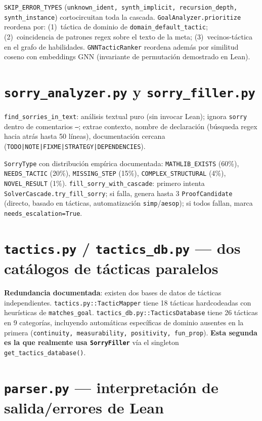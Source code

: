 \documentclass[11pt,a4paper]{report}
\newcommand{\code}[1]{\texttt{#1}}
\begin{document}
\code{SKIP\_ERROR\_TYPES} (\code{unknown_ident, synth_implicit, recursion_depth, synth_instance}) cortocircuitan toda la cascada. \code{GoalAnalyzer.prioritize} reordena por: (1)~t\'actica de dominio de \code{domain_default_tactic}; (2)~coincidencia de patrones regex sobre el texto de la meta; (3)~vecinos-t\'actica en el grafo de habilidades. \code{GNNTacticRanker} reordena adem\'as por similitud coseno con embeddings GNN (invariante de permutaci\'on demostrado en Lean).

\section{\code{sorry_analyzer.py} y \code{sorry_filler.py}}

\code{find_sorries_in_text}: an\'alisis textual puro (sin invocar Lean); ignora \code{sorry} dentro de comentarios \code{--}; extrae contexto, nombre de declaraci\'on (b\'usqueda regex hacia atr\'as hasta 50 l\'ineas), documentaci\'on cercana (\code{TODO|NOTE|FIXME|STRATEGY|DEPENDENCIES}).

\code{SorryType} con distribuci\'on emp\'irica documentada: \code{MATHLIB_EXISTS} (60\%), \code{NEEDS_TACTIC} (20\%), \code{MISSING_STEP} (15\%), \code{COMPLEX_STRUCTURAL} (4\%), \code{NOVEL_RESULT} (1\%). \code{fill_sorry_with_cascade}: primero intenta \code{SolverCascade.try_fill_sorry}; si falla, genera hasta 3 \code{ProofCandidate} (directo, basado en t\'acticas, automatizaci\'on \code{simp}/\code{aesop}); si todos fallan, marca \code{needs_escalation=True}.

\section{\code{tactics.py} / \code{tactics_db.py} --- dos cat\'alogos de t\'acticas paralelos}

\textbf{Redundancia documentada}: existen dos bases de datos de t\'acticas independientes. \code{tactics.py::TacticMapper} tiene 18 t\'acticas hardcodeadas con heur\'isticas de \code{matches_goal}. \code{tactics_db.py::TacticsDatabase} tiene 26 t\'acticas en 9 categor\'ias, incluyendo autom\'aticas espec\'ificas de dominio ausentes en la primera (\code{continuity, measurability, positivity, fun_prop}). \textbf{Esta segunda es la que realmente usa \code{SorryFiller}} v\'ia el singleton \code{get_tactics_database()}.

\section{\code{parser.py} --- interpretaci\'on de salida/errores de Lean}
\end{document}
